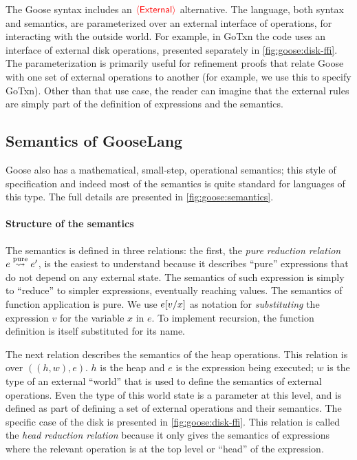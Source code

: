 The Goose syntax includes an $\external$ alternative. The language, both syntax
and semantics, are parameterized over an external interface of operations, for
interacting with the outside world. For example, in GoTxn the code uses an
interface of external disk operations, presented separately in
\cref{fig:goose:disk-ffi}. The parameterization is primarily useful for
refinement proofs that relate Goose with one set of external operations to
another (for example, we use this to specify GoTxn). Other than that use case,
the reader can imagine that the external rules are simply part of the definition
of expressions and the semantics.

\subsection{Semantics of GooseLang}%
\label{sec:goose:semantics}

Goose also has a mathematical, small-step, operational semantics; this style of
specification and indeed most of the semantics is quite standard for languages of
this type. The full details are presented in \cref{fig:goose:semantics}.



\paragraph{Structure of the semantics}
The semantics is defined in three relations: the first, the
\emph{pure reduction relation} $e \purereduction e'$, is the easiest to understand
because it describes ``pure'' expressions that do not depend on any external
state. The semantics of such expression is simply to ``reduce'' to simpler
expressions, eventually reaching values. The semantics of function application
is pure. We use $\subst{e}{x}{v}$ as notation for \emph{substituting} the expression
$v$ for the variable $x$ in $e$. To implement recursion, the function definition
is itself substituted for its name.

The next relation describes the semantics of the heap operations. This relation is over
$((h, w), e)$. $h$ is the heap and $e$ is the expression being executed; $w$ is
the type of an external ``world'' that is used to define the semantics of
external operations. Even the type of this world state is a parameter at this
level, and is defined as part of defining a set of external operations and their
semantics. The specific case of the disk is presented in
\cref{fig:goose:disk-ffi}. This
relation is called the \emph{head reduction
relation} because it only gives the semantics of expressions where the
relevant operation is at the top level or ``head'' of the expression.

